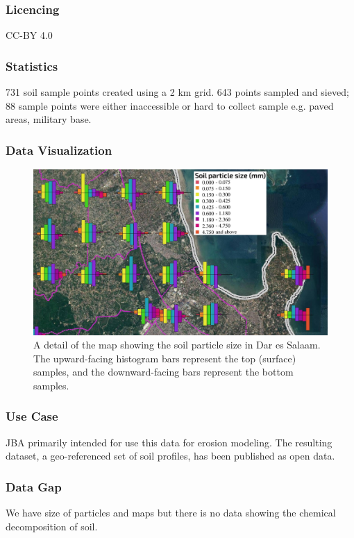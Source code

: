 \documentclass[a4paper,12pt,twoside]{article}
\begin{document}
\subsubsection{Licencing}
CC-BY 4.0

\subsubsection{Statistics}
731 soil sample points created using a 2 km grid. 643 points sampled and sieved; 88 sample points were either inaccessible or hard to collect sample e.g. paved areas, military base.

\subsubsection{Data Visualization}
\begin{figure}[h]
  \color{RHgreen}\caption{A detail of the map showing the soil particle size in Dar es Salaam. The upward-facing histogram bars represent the top (surface) samples, and the downward-facing bars represent the bottom samples.}
  \centering
  \includegraphics[width=1\textwidth]{soil_map_detail_peninsula_with_legend}
\end{figure}

\subsubsection{Use Case}
JBA  primarily intended for use this data for erosion modeling. The resulting dataset, a geo-referenced set of soil profiles, has been published as open data.

\subsubsection{Data Gap}
We have size of particles and maps but there is no data showing the chemical decomposition of soil.
\end{document}
